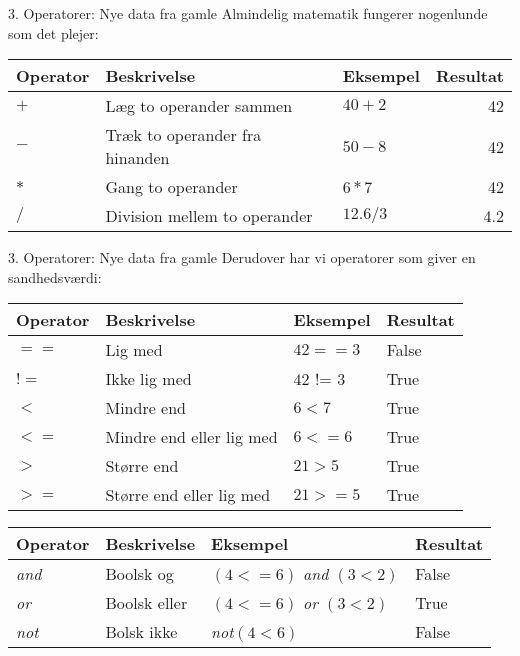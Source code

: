 \documentclass[10pt]{beamer}
\begin{document}

\begin{frame}{3. Operatorer: Nye data fra gamle}
Almindelig matematik fungerer nogenlunde som det plejer:
\begin{center}
	\begin{tabular}{lllr}
		\hline
		Operator			& 		Beskrivelse								&		Eksempel		&		Resultat	\\ \hline \hline
		$+$					&		Læg to operander sammen					&		$40 + 2$		&		42			\\
		$-$					&		Træk to operander fra hinanden			&		$50 - 8$		&		42			\\
		$*$					&		Gang to operander 						&		$6 * 7$			&		42			\\
		$/$					&		Division mellem to operander			&		$12.6 / 3$		&		4.2			\\
	\end{tabular}
\end{center}
\end{frame}


\begin{frame}{3. Operatorer: Nye data fra gamle}
Derudover har vi operatorer som giver en sandhedsværdi:
\begin{center}
	\begin{tabular}{llll}
		\hline
		Operator			& 		Beskrivelse								&		Eksempel		&		Resultat		\\ \hline \hline
		$==$				&		Lig med									&		$42 == 3$		&		False			\\
		$!=$				&		Ikke lig med							&		$42$ != $3$		&		True			\\
		$<$					&		Mindre end		 						&		$6 < 7$			&		True			\\
		$<=$				&		Mindre end eller lig med				&		$6 <= 6$		&		True			\\
		$>$					&		Større end								&		$21 > 5$		&		True			\\
		$>=$				&		Større end eller lig med				&		$21 >= 5$		&		True			\\
	\end{tabular}
\end{center}

\begin{center}
	\begin{tabular}{llll}
		\hline
		Operator			& 		Beskrivelse								&		Eksempel					&		Resultat		\\ \hline \hline
		\textit{and}				&		Boolsk og								&		$(4 <= 6)$ \textit{and} $(3 < 2)$		&		False			\\
		\textit{or}				&		Boolsk eller							&		$(4 <= 6)$ \textit{or} $(3 < 2)$		&		True			\\
		\textit{not}				&		Bolsk ikke		 						&		\textit{not}$(4 < 6)$				&		False			\\
	\end{tabular}
\end{center}
\end{frame}
\end{document}

